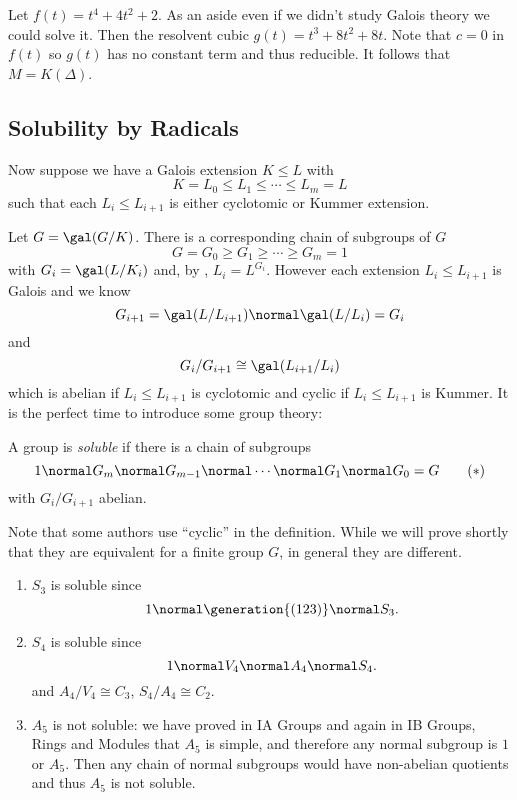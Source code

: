 \documentclass[a4paper]{article}
\begin{document}
\begin{eg}
  Let \(f(t) = t^4 + 4t^2 + 2\). As an aside even if we didn't study Galois theory we could solve it. Then the resolvent cubic \(g(t) = t^3 + 8t^2 + 8t\). Note that \(c = 0\) in \(f(t)\) so \(g(t)\) has no constant term and thus reducible. It follows that \(M = K(\Delta)\).
\end{eg}

\subsection{Solubility by Radicals}

Now suppose we have a Galois extension \(K \leq L\) with
\[
  K = L_0 \leq L_1 \leq \cdots \leq L_m = L
\]
such that each \(L_i \leq L_{i + 1}\) is either cyclotomic or Kummer extension.

Let \(G = \gal(G/K)\). There is a corresponding chain of subgroups of \(G\)
\[
  G = G_0 \geq G_1 \geq \cdots \geq G_m = 1
\]
with \(G_i = \gal(L/K_i)\) and, by , \(L_i = L^{G_i}\). However each extension \(L_i \leq L_{i + 1}\) is Galois and we know
\[
  G_{i + 1} = \gal(L/L_{i + 1}) \normal \gal(L/L_i) = G_i
\]
and
\[
  G_i/G_{i + 1} \cong \gal(L_{i + 1}/L_i)
\]
which is abelian if \(L_i \leq L_{i + 1}\) is cyclotomic and cyclic if \(L_i \leq L_{i + 1}\) is Kummer. It is the perfect time to introduce some group theory:

\begin{definition}
  A group is \emph{soluble} if there is a chain of subgroups
  \begin{equation*}
    \label{eqn:abelian soluble}
    1 \normal G_m \normal G_{m - 1} \normal \cdots \normal G_1 \normal G_0 = G
    \tag{\(\ast\)}
  \end{equation*}
  with \(G_i/G_{i + 1}\) abelian.
\end{definition}

\begin{remark}
  Note that some authors use ``cyclic'' in the definition. While we will prove shortly that they are equivalent for a finite group \(G\), in general they are different.
\end{remark}

\begin{eg}\leavevmode
  \begin{enumerate}
  \item \(S_3\) is soluble since
    \[
      1 \normal \generation{(123)} \normal S_3.
    \]
  \item \(S_4\) is soluble since
    \[
      1 \normal V_4 \normal A_4 \normal S_4.
    \]
    and \(A_4/V_4 \cong C_3\), \(S_4/A_4 \cong C_2\).
  \item \(A_5\) is not soluble: we have proved in IA Groups and again in IB Groups, Rings and Modules that \(A_5\) is simple, and therefore any normal subgroup is \(1\) or \(A_5\). Then any chain of normal subgroups would have non-abelian quotients and thus \(A_5\) is not soluble.
  \end{enumerate}
\end{eg}
\end{document}
